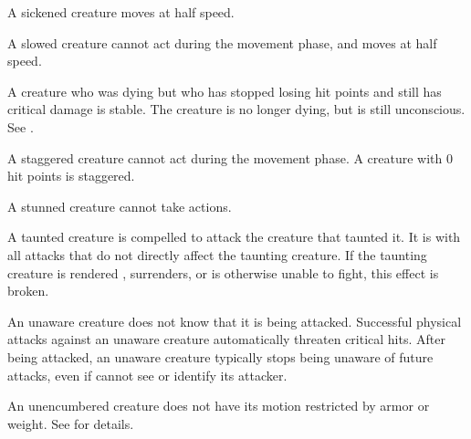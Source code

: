  A sickened creature moves at half speed.

 A slowed creature cannot act during the movement phase, and moves at half speed.

 A creature who was dying but who has stopped losing hit points and still has critical damage is stable. The creature is no longer dying, but is still unconscious. See .

 A staggered creature cannot act during the movement phase. A creature with 0 hit points is staggered.

 A stunned creature cannot take actions.

 A taunted creature is compelled to attack the creature that taunted it.
It is \impaired with all attacks that do not directly affect the taunting creature.
If the taunting creature is rendered \helpless, surrenders, or is otherwise unable to fight, this effect is broken.

 An unaware creature does not know that it is being attacked. Successful physical attacks against an unaware creature automatically threaten critical hits. After being attacked, an unaware creature typically stops being unaware of future attacks, even if cannot see or identify its attacker.

 An unencumbered creature does not have its motion restricted by armor or weight. See  for details.
